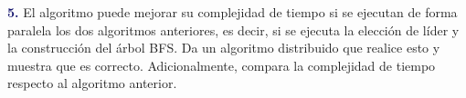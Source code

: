 \newpage
\textbf{\textcolor{MidnightBlue}{5.}} El algoritmo puede mejorar su complejidad de tiempo si se ejecutan de forma paralela
los dos algoritmos anteriores, es decir, si se ejecuta la elección de líder y la construcción del árbol BFS. Da un algoritmo distribuido que realice esto y muestra que es correcto. Adicionalmente,
compara la complejidad de tiempo respecto al algoritmo anterior.